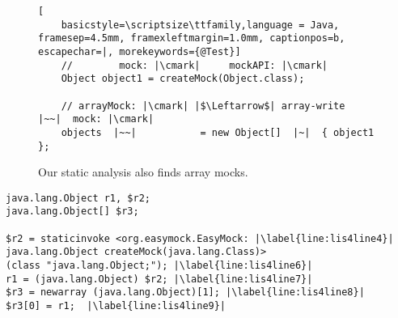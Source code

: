 \begin{figure}
	\begin{lstlisting}[
	basicstyle=\scriptsize\ttfamily,language = Java, framesep=4.5mm, framexleftmargin=1.0mm, captionpos=b, escapechar=|, morekeywords={@Test}]
	//        mock: |\cmark|     mockAPI: |\cmark|
	Object object1 = createMock(Object.class);
	
	// arrayMock: |\cmark| |$\Leftarrow$| array-write    |~~|  mock: |\cmark|
	objects  |~~|           = new Object[]  |~|  { object1 };
	\end{lstlisting}
	
	\caption{Our static analysis also finds array mocks.}
	\label{fig:arrayMockIllustration}
	
\end{figure}

\begin{lstlisting}[basicstyle=\ttfamily, caption={Jimple Intermediate Representation for the array in Figure~\ref{fig:arrayMockIllustration}.},
basicstyle=\scriptsize\ttfamily, framesep=4.5mm, framexleftmargin=1.0mm, captionpos=b, label=lis:arrayIllustrationIR, escapechar=|, morekeywords={@Test, specialinvoke, virtualinvoke, staticinvoke, newarray}]
java.lang.Object r1, $r2;
java.lang.Object[] $r3;

$r2 = staticinvoke <org.easymock.EasyMock: |\label{line:lis4line4}|
java.lang.Object createMock(java.lang.Class)>
(class "java.lang.Object;"); |\label{line:lis4line6}|
r1 = (java.lang.Object) $r2; |\label{line:lis4line7}|
$r3 = newarray (java.lang.Object)[1]; |\label{line:lis4line8}|
$r3[0] = r1;  |\label{line:lis4line9}|
\end{lstlisting}
